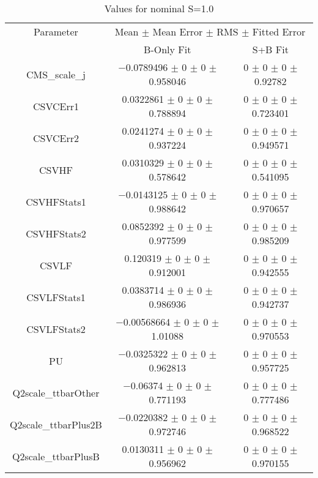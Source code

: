 \begin{table}
\centering
\caption{Values for nominal S=1.0}
\begin{tabular}{ccc}
\toprule
Parameter & \multicolumn{2}{c}{Mean $\pm$ Mean Error $\pm$ RMS $\pm$ Fitted Error}\\
 & B-Only Fit & S+B Fit\\
\midrule
CMS\_scale\_j & \num{-0.0789496} $\pm$ \num{0} $\pm$ \num{0} $\pm$ \num{0.958046} & \num{0} $\pm$ \num{0} $\pm$ \num{0} $\pm$ \num{0.92782}\\
CSVCErr1 & \num{0.0322861} $\pm$ \num{0} $\pm$ \num{0} $\pm$ \num{0.788894} & \num{0} $\pm$ \num{0} $\pm$ \num{0} $\pm$ \num{0.723401}\\
CSVCErr2 & \num{0.0241274} $\pm$ \num{0} $\pm$ \num{0} $\pm$ \num{0.937224} & \num{0} $\pm$ \num{0} $\pm$ \num{0} $\pm$ \num{0.949571}\\
CSVHF & \num{0.0310329} $\pm$ \num{0} $\pm$ \num{0} $\pm$ \num{0.578642} & \num{0} $\pm$ \num{0} $\pm$ \num{0} $\pm$ \num{0.541095}\\
CSVHFStats1 & \num{-0.0143125} $\pm$ \num{0} $\pm$ \num{0} $\pm$ \num{0.988642} & \num{0} $\pm$ \num{0} $\pm$ \num{0} $\pm$ \num{0.970657}\\
CSVHFStats2 & \num{0.0852392} $\pm$ \num{0} $\pm$ \num{0} $\pm$ \num{0.977599} & \num{0} $\pm$ \num{0} $\pm$ \num{0} $\pm$ \num{0.985209}\\
CSVLF & \num{0.120319} $\pm$ \num{0} $\pm$ \num{0} $\pm$ \num{0.912001} & \num{0} $\pm$ \num{0} $\pm$ \num{0} $\pm$ \num{0.942555}\\
CSVLFStats1 & \num{0.0383714} $\pm$ \num{0} $\pm$ \num{0} $\pm$ \num{0.986936} & \num{0} $\pm$ \num{0} $\pm$ \num{0} $\pm$ \num{0.942737}\\
CSVLFStats2 & \num{-0.00568664} $\pm$ \num{0} $\pm$ \num{0} $\pm$ \num{1.01088} & \num{0} $\pm$ \num{0} $\pm$ \num{0} $\pm$ \num{0.970553}\\
PU & \num{-0.0325322} $\pm$ \num{0} $\pm$ \num{0} $\pm$ \num{0.962813} & \num{0} $\pm$ \num{0} $\pm$ \num{0} $\pm$ \num{0.957725}\\
Q2scale\_ttbarOther & \num{-0.06374} $\pm$ \num{0} $\pm$ \num{0} $\pm$ \num{0.771193} & \num{0} $\pm$ \num{0} $\pm$ \num{0} $\pm$ \num{0.777486}\\
Q2scale\_ttbarPlus2B & \num{-0.0220382} $\pm$ \num{0} $\pm$ \num{0} $\pm$ \num{0.972746} & \num{0} $\pm$ \num{0} $\pm$ \num{0} $\pm$ \num{0.968522}\\
Q2scale\_ttbarPlusB & \num{0.0130311} $\pm$ \num{0} $\pm$ \num{0} $\pm$ \num{0.956962} & \num{0} $\pm$ \num{0} $\pm$ \num{0} $\pm$ \num{0.970155}\\

\end{tabular}
\end{table}
